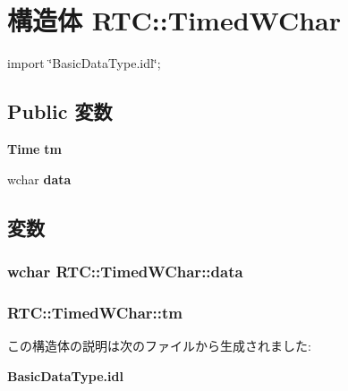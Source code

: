 \section{構造体 RTC::TimedWChar}
\label{structRTC_1_1TimedWChar}


{\ttfamily import \char`\"{}BasicDataType.idl\char`\"{};}

\subsection*{Public 変数}
\begin{DoxyCompactItemize}
\item 
{\bf Time} {\bf tm}
\item 
wchar {\bf data}
\end{DoxyCompactItemize}


\subsection{変数}
\subsubsection[{data}]{\setlength{\rightskip}{0pt plus 5cm}wchar {\bf RTC::TimedWChar::data}}\label{structRTC_1_1TimedWChar_aab03a9cfe9456f67c52307ba22f2a18e}
\subsubsection[{tm}]{ {\bf RTC::TimedWChar::tm}}\label{structRTC_1_1TimedWChar_a8049ca8b61d0a05e28181776e5437fca}


この構造体の説明は次のファイルから生成されました:\begin{DoxyCompactItemize}
\item 
{\bf BasicDataType.idl}\end{DoxyCompactItemize}

